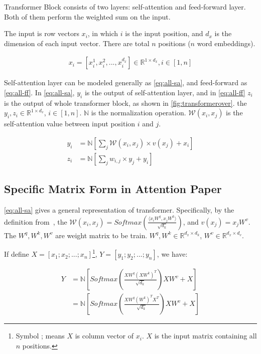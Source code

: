 \documentclass[final]{cvpr}
\begin{document}
Transformer Block consists of two layers: self-attention and feed-forward layer. Both of them perform the weighted sum on the input.

The input is row vectors $x_i$, in which $i$ is the input position, and $d_x$ is the dimension of each input vector. There are total $n$ positions ($n$ word embeddings).

\begin{align*}
    x_i=[x_i^1, x_i^2, ..., x_i^{d_x}]\in\mathbb{R}^{1\times{d_x}}, i\in[1,n]
\end{align*}

Self-attention layer can be modeled generally as \autoref{eq:all-sa}, and feed-forward as \autoref{eq:all-ff}. In \autoref{eq:all-sa}, $y_i$ is the output of self-attention layer, and in \autoref{eq:all-ff} $z_i$ is the output of whole transformer block, as shown in \autoref{fig:transformerover}. the $y_i, z_i\in\mathbb{R}^{1\times{d_v}}$, $i\in[1,n]$. $\mathbb{N}$ is the normalization operation. $\mathcal{W}(x_i,x_j)$ is the self-attention value between input position $i$ and $j$. 

\begin{align}
    {y_i}&=\mathbb{N}\left[\sum_{j}\mathcal{W}(x_i,x_j)\times{v}({x_j})+x_i\right]\label{eq:all-sa}\\
    {z_i}&=\mathbb{N}\left[\sum_jw_{i,j}\times{y_j}+y_i\right]\label{eq:all-ff}
\end{align}

\subsection{Specific Matrix Form in Attention Paper}
\label{sec:spe}
\autoref{eq:all-sa} gives a general representation of transformer. Specifically, by the definition from~\cite{vaswani2017attention}, the $\mathcal{W}(x_i,x_j)=Softmax(\frac{\langle x_iW^q,x_jW^k\rangle}{\sqrt{d_k}})$, and $v(x_j)=x_jW^v$. The $W^q, W^k, W^v$ are weight matrix to be train. $W^q,W^k\in\mathbb{R}^{{d_x}\times{d_k}}$, $W^v\in\mathbb{R}^{d_x\times{d_v}}$.

If define $X=[x_1;x_2;...;x_n]$\footnote{Symbol ; means $X$ is column vector of $x_i$. $X$ is the input matrix containing all $n$ positions.}, $Y=[y_1;y_2;...;y_n]$, we have:

\begin{align}
    Y&=\mathbb{N}\left[Softmax\left(\frac{XW^q(XW^k)^T}{\sqrt{d_k}}\right)XW^v+X\right]\\
     &=\mathbb{N}\left[Softmax\left(\frac{XW^q(W^k)^TX^T}{\sqrt{d_k}}\right)XW^v+X\right]
\end{align}
\end{document}
